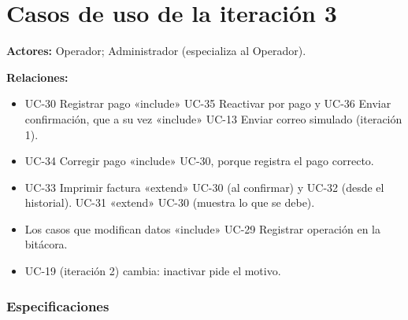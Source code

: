 \section{Casos de uso de la iteración 3}



\textbf{Actores:} Operador; Administrador (especializa al Operador).


\textbf{Relaciones:}

\begin{itemize}
  \item UC-30 Registrar pago «include» UC-35 Reactivar por pago y UC-36 Enviar confirmación, que a su vez «include» UC-13 Enviar correo simulado (iteración 1).
  \item UC-34 Corregir pago «include» UC-30, porque registra el pago correcto.
  \item UC-33 Imprimir factura «extend» UC-30 (al confirmar) y UC-32 (desde el historial). UC-31 «extend» UC-30 (muestra lo que se debe).
  \item Los casos que modifican datos «include» UC-29 Registrar operación en la bitácora.
  \item UC-19 (iteración 2) cambia: inactivar pide el motivo.
\end{itemize}

\subsubsection{Especificaciones}

